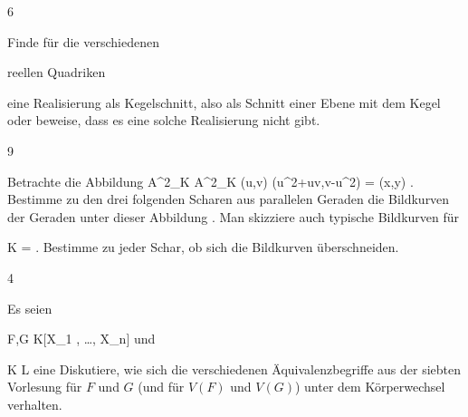 
{6}
{





Finde für die verschiedenen

reellen Quadriken

eine Realisierung als Kegelschnitt, also als Schnitt einer Ebene mit dem Kegel
 oder beweise, dass es eine solche Realisierung nicht gibt.





}
{} {}

{9}
{





Betrachte die Abbildung
\maabbeledisp {} { {\mathbb A}^{2}_{K}  } { {\mathbb A}^{2}_{K}
} { (u,v) } { (u^2+uv,v-u^2) = (x,y)
} {.}
Bestimme zu den drei folgenden Scharen aus parallelen Geraden die Bildkurven der Geraden unter dieser Abbildung
 {} {.}
Man skizziere auch typische Bildkurven für

\mavergleichskette
{\vergleichskette
{ K
}
{ = }{ \R
}
{  }{
}
{    }{
}
{   }{
}
}
{}{}{.}
Bestimme zu jeder Schar, ob sich die Bildkurven überschneiden.





}
{} {}

{4}
{





Es seien

\mavergleichskette
{\vergleichskette
{ F,G
}
{ \in }{ K[X_1 , \ldots ,  X_n]
}
{  }{
}
{    }{
}
{   }{
}
}
{}{}{}
und

\mavergleichskette
{\vergleichskette
{ K
}
{ \subseteq }{ L
}
{  }{
}
{    }{
}
{   }{
}
}
{}{}{}
eine
Diskutiere, wie sich die verschiedenen Äquivalenzbegriffe aus der siebten Vorlesung für $F$ und $G$ (und für $V(F)$ und $V(G)$) unter dem Körperwechsel verhalten.





}
{} {}

